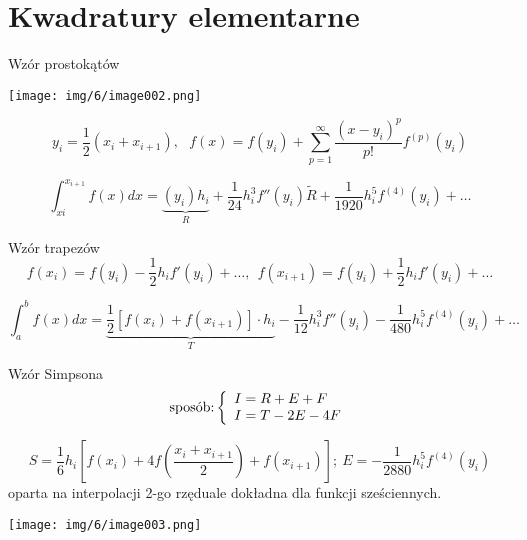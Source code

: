 \section{Kwadratury elementarne}
	\begin{frame}{Wzór prostokątów}
      	\begin{center}
      		\texttt{[image: img/6/image002.png]}
      	\end{center}
        
		$$
y_{i}= \frac{1}{2}(x_{i}+x_{i+1}),\ \ \ f(x)=f(y_{i})+ \sum_{p=1}^{\infty}\frac{(x-y_{i})^{p}}{p!}f^{(p)}(y_{i})
		$$
        
		$$
\int_{xi}^{x_{i+1}}f(x)dx=\underbrace{(y_{i})h_{i}}_{R}+\frac{1}{24}h_{i}^{3}f''(y_{i})\tilde{R}+\frac{1}{1920}h_{i}^{5}f^{(4)}(y_{i})+\ldots
		$$
	\end{frame}
	\begin{frame}{Wzór trapezów}
    	$$
f(x_{i})=f(y_{i})- \frac{1}{2}h_{i}f'(y_{i})+\ldots,\ \ f(x_{i+1})=f(y_{i})+ \frac{1}{2}h_{i}f'(y_{i})+\ldots
        $$
        
		$$
\int_{a}^{b}f(x)dx=\underbrace{\frac{1}{2}[f(x_{i}) + f(x_{i+1})] \cdot h_{i}}_{T} - \frac{1}{12}h_{i}^{3} f''(y_{i})-\frac{1}{480}h_{i}^{5}f^{(4)}(y_{i})+\ldots
		$$ 
	\end{frame}
	\begin{frame}{Wzór Simpsona}
		$$
        \textnormal{sposób:} \left\{\begin{array}{l}
  			I = R + E + F \\
        	I = T - 2E - 4F
        \end{array}\right.
        $$
        
        $$
S = \frac{1}{6}h_{i}[f(x_{i})+4f(\frac{x_{i}+x_{i+1}}{2})+f(x_{i+1})];\ E=-\frac{1}{2880}h_{i}^{5}f^{(4)}(y_{i})
		$$
        oparta na interpolacji 2-go rzędu\newline ale dokładna dla funkcji sześciennych.
        
      	\begin{center}
      		\texttt{[image: img/6/image003.png]}
      	\end{center}
	\end{frame}
